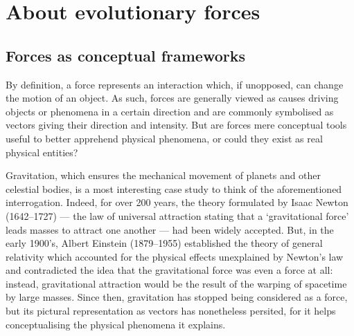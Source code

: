 \section{About evolutionary forces}

\subsection{Forces as conceptual frameworks} 

By definition, a force represents an interaction which, if unopposed, can change the motion of an object.
As such, forces are generally viewed as causes driving objects or phenomena in a certain direction and are commonly symbolised as vectors giving their direction and intensity.
But are forces mere conceptual tools useful to better apprehend physical phenomena, or could they exist as real physical entities?

Gravitation, which ensures the mechanical movement of planets and other celestial bodies, is a most interesting case study to think of the aforementioned interrogation.
Indeed, for over 200 years, the theory formulated by Isaac Newton (1642--1727) — the law of universal attraction stating that a ‘gravitational force’ leads masses to attract one another — had been widely accepted.
But, in the early 1900's, Albert Einstein (1879--1955) established the theory of general relativity which accounted for the physical effects unexplained by Newton's law and contradicted the idea that the gravitational force was even a force at all: instead, gravitational attraction would be the result of the warping of spacetime by large masses.
Since then, gravitation has stopped being considered as a force, but its pictural representation as vectors has nonetheless persited, for it helps conceptualising the physical phenomena it explains.

